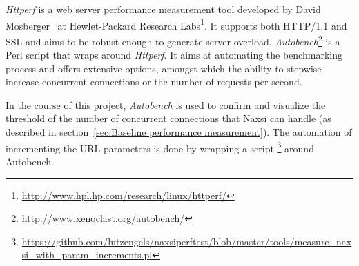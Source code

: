 \emph{Httperf} is a web server performance measurement tool developed by David Mosberger~\cite{mosberger1998httperf} at Hewlet-Packard Research Labs\footnote{\url{http://www.hpl.hp.com/research/linux/httperf/}}. It supports both HTTP/1.1 and SSL and aims to be robust enough to generate server overload. \emph{Autobench}\footnote{\url{http://www.xenoclast.org/autobench/}} is a Perl script that wraps around \emph{Httperf}. It aims at automating the benchmarking process and offers extensive options, amongst which the ability to stepwise increase concurrent connections or the number of requests per second. 

In the course of this project, \emph{Autobench} is used to confirm and visualize the threshold of the number of concurrent connections that Naxsi can handle (as described in section~\ref{sec:Baseline performance measurement}). The automation of incrementing the URL parameters is done by wrapping a script \footnote{\url{https://github.com/lutzengels/naxsiperftest/blob/master/tools/measure_naxsi_with_param_increments.pl}}  around Autobench.